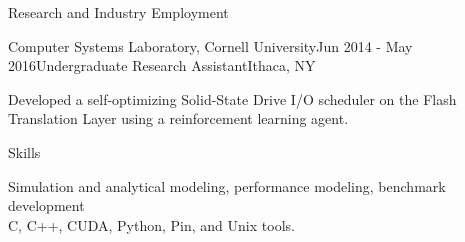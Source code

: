 \documentclass{resume} %
\begin{document}
\begin{rSection}{Research and Industry Employment}
\begin{rSubsection}{Computer Systems Laboratory, Cornell University}{Jun 2014 - May 2016}{Undergraduate Research Assistant}{Ithaca, NY}

\item Developed a self-optimizing Solid-State Drive I/O scheduler on the Flash Translation Layer using a reinforcement learning agent. 
\end{rSubsection}


\end{rSection}

\vspace{1cm}


\begin{rSection}{Skills}

Simulation and analytical modeling, performance modeling, benchmark development \\
C, C++, CUDA, Python, Pin, and Unix tools. \\

\end{rSection}

\end{document}
